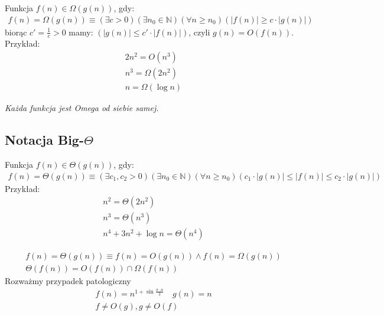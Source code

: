 \documentclass{article}
\newenvironment{definition}[1]{%
    \trivlist
    \item[\hskip\labelsep\textbf{Definition. #1.}]
    \ignorespaces
}{%
    \endtrivlist
}
\newenvironment{fact}[1]{%
    \trivlist
    \item[\hskip\labelsep\textbf{Fact. #1.}]
    \ignorespaces
}{%
    \endtrivlist
}
\begin{document}
\begin{definition}{Notacja Big-$\Omega$}
    Funkcja $f(n)\in \Omega(g(n))$, gdy:
    \begin{align}
        f(n) = \Omega(g(n)) \equiv 
        \left(\exists c>0\right)
        \left(\exists n_0\in\mathbb{N}\right)
        \left(\forall n\geq n_0\right)
        \left(|f(n)| \geq c \cdot |g(n)|\right)
    \end{align}
    \noindent
    biorąc $c' = \frac{1}{c} > 0$ mamy: $(|g(n)| \leq c' \cdot |f(n)|)$, czyli $g(n) = O(f(n))$.\\
    Przykład:
    \begin{align}
        2n^2 = O(n^3)\\
        n^3 = \Omega(2n^2)\\
        n = \Omega(\log n)
    \end{align}

    \noindent
    \textit{Każda funkcja jest Omega od siebie samej.}
\end{definition}

\subsection{Notacja Big-$\Theta$}

\begin{definition}{Notacja Big-$\Theta$}
    Funkcja $f(n)\in \Theta(g(n))$, gdy:
    \begin{align}
        f(n) = \Theta(g(n)) \equiv 
        \left(\exists c_1, c_2 > 0\right)
        \left(\exists n_0\in\mathbb{N}\right)
        \left(\forall n\geq n_0\right)
        \left(c_1 \cdot |g(n)| \leq |f(n)| \leq c_2 \cdot |g(n)|\right)
    \end{align}
    \noindent
    Przykład:
    \begin{align}
        n^2 = \Theta(2n^2)\\
        n^3 = \Theta(n^3)\\
        n^4 + 3n^2 + \log n = \Theta(n^4)
    \end{align}
\end{definition}

\begin{fact}{Dokładność zapisu Theta}
    \begin{align}
        f(n) = \Theta(g(n)) \equiv f(n) = O(g(n)) \land f(n) = \Omega(g(n))\\
        \Theta(f(n)) = O(f(n)) \cap \Omega(f(n))
    \end{align}
\end{fact}
Rozważmy przypadek patologiczny
\begin{align}
    f(n) = n^{1+\sin \frac{\pi \cdot n}{2}}\quad g(n) = n\\
    f\neq O(g), g\neq O(f)
\end{align}
\end{document}
